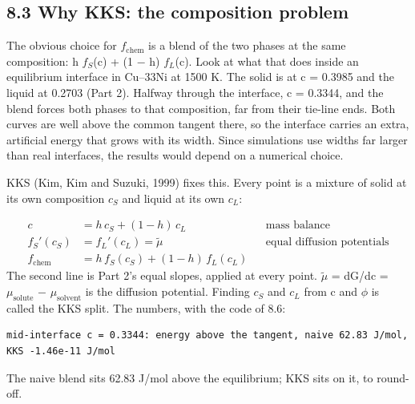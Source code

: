 \documentclass[12pt,a4paper]{article}
\begin{document}
\subsection*{8.3 Why KKS: the composition problem}
The obvious choice for \(f_{\mathrm{chem}}\) is a blend of the two phases at the same composition: h \(f_{S}\)(c) + (1 \(-\) h) \(f_{L}\)(c). Look at what that does inside an equilibrium interface in Cu--33Ni at 1500 K. The solid is at c = 0.3985 and the liquid at 0.2703 (Part 2). Halfway through the interface, c = 0.3344, and the blend forces both phases to that composition, far from their tie-line ends. Both curves are well above the common tangent there, so the interface carries an extra, artificial energy that grows with its width. Since simulations use widths far larger than real interfaces, the results would depend on a numerical choice.

KKS (Kim, Kim and Suzuki, 1999) fixes this. Every point is a mixture of solid at its own composition \(c_{S}\) and liquid at its own \(c_{L}\):

\begin{align*}
c &= h\,c_S + (1-h)\,c_L && \text{mass balance}\\
f_S'(c_S) &= f_L'(c_L) = \tilde{\mu} && \text{equal diffusion potentials}\\
f_{\mathrm{chem}} &= h\,f_S(c_S) + (1-h)\,f_L(c_L)
\end{align*}
The second line is Part 2's equal slopes, applied at every point. \(\tilde{\mu}\) = dG/dc = \(\mu_{\mathrm{solute}}\) \(-\) \(\mu_{\mathrm{solvent}}\) is the diffusion potential. Finding \(c_{S}\) and \(c_{L}\) from c and \(\phi\) is called the KKS split. The numbers, with the code of 8.6:

\begin{lstlisting}[basicstyle={\scriptsize\ttfamily}]
mid-interface c = 0.3344: energy above the tangent, naive 62.83 J/mol, KKS -1.46e-11 J/mol
\end{lstlisting}
The naive blend sits 62.83 J/mol above the equilibrium; KKS sits on it, to round-off.


\end{document}
